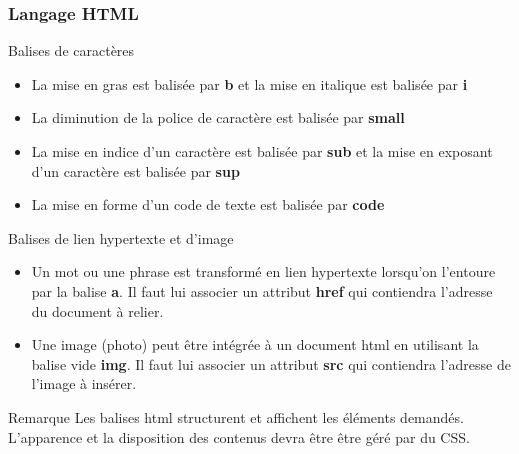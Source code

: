 \documentclass[8pt]{beamer}
\begin{document}
\begin{frame}
\frametitle{Langage HTML}

\begin{block}{Balises de caractères}
\begin{itemize}
\item La mise en gras est balisée par \textbf{b} et la mise en italique est balisée par \textbf{i} 
\item La diminution de la police de caractère est balisée par \textbf{small}
\item La mise en indice d'un caractère est balisée par \textbf{sub} et la mise en exposant d'un caractère est balisée par  \textbf{sup}
\item La mise en forme d'un code de texte est balisée par \textbf{code}
\end{itemize}
\end{block}

\begin{block}{Balises de lien hypertexte et d'image}
\begin{itemize}
\item Un mot ou une phrase est transformé en lien hypertexte lorsqu'on l'entoure par la balise \textbf{a}. Il faut lui associer un attribut \textbf{href} qui contiendra l'adresse du document à relier.
\item Une image (photo) peut être intégrée à un document html en utilisant la balise vide \textbf{img}. Il faut lui associer un attribut \textbf{src} qui contiendra l'adresse de l'image à insérer.
\end{itemize}
\end{block}

\begin{alertblock}{Remarque}
Les balises html structurent et affichent les éléments demandés. L'apparence et la disposition des contenus devra être être géré par du CSS.
\end{alertblock}
\end{frame}
\end{document}
